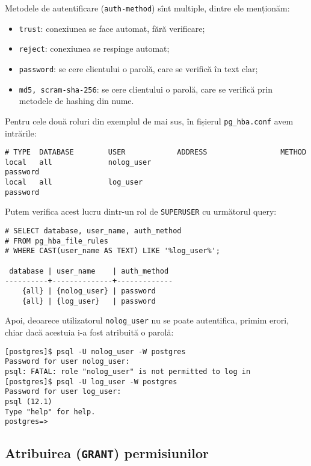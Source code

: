 Metodele de autentificare (\texttt{auth-method}) sînt multiple, dintre ele menționăm:
\begin{itemize}
\item \texttt{trust}: conexiunea se face automat, fără verificare;
\item \texttt{reject}: conexiunea se respinge automat;
\item \texttt{password}: se cere clientului o parolă, care se verifică în text clar;
\item \texttt{md5, scram-sha-256}: se cere clientului o parolă, care se verifică
  prin metodele de hashing din nume.
\end{itemize}

Pentru cele două roluri din exemplul de mai sus, în fișierul \texttt{pg\_hba.conf}
avem intrările:
{
  \small
\begin{verbatim}
# TYPE  DATABASE        USER            ADDRESS                 METHOD
local   all             nolog_user                              password
local   all             log_user                                password
\end{verbatim}
}

Putem verifica acest lucru dintr-un rol de \texttt{SUPERUSER} cu următorul
query:
{
  \small
\begin{verbatim}
# SELECT database, user_name, auth_method
# FROM pg_hba_file_rules
# WHERE CAST(user_name AS TEXT) LIKE '%log_user%';

 database | user_name    | auth_method 
----------+--------------+-------------
    {all} | {nolog_user} | password
    {all} | {log_user}   | password
\end{verbatim}
}

Apoi, deoarece utilizatorul \texttt{nolog\_user} nu se poate autentifica,
primim erori, chiar dacă acestuia i-a fost atribuită o parolă:
{
  \small
\begin{verbatim}
[postgres]$ psql -U nolog_user -W postgres
Password for user nolog_user: 
psql: FATAL: role "nolog_user" is not permitted to log in
[postgres]$ psql -U log_user -W postgres
Password for user log_user: 
psql (12.1)
Type "help" for help.
postgres=>
\end{verbatim}
}

\subsection{Atribuirea (\texttt{GRANT}) permisiunilor}

